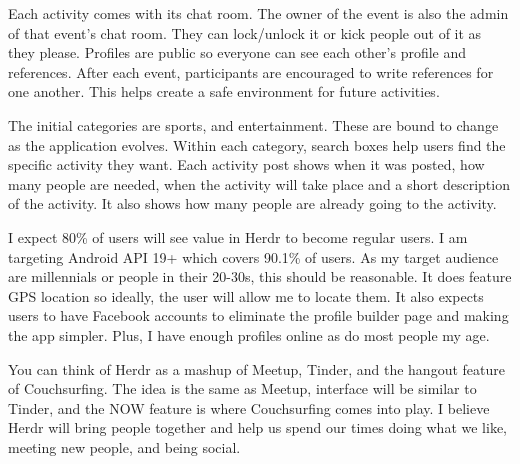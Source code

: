 \documentclass{article}
\begin{document}
Each activity comes with its chat room. The owner of the event is also the admin of that event's chat room. They can lock/unlock it or kick people out of it as they please. Profiles are public so everyone can see each other's profile and references. After each event, participants are encouraged to write references for one another. This helps create a safe environment for future activities.
\hfill \linebreak

The initial categories are sports, and entertainment. These are bound to change as the application evolves. Within each category, search boxes help users find the specific activity they want. Each activity post shows when it was posted, how many people are needed, when the activity will take place and a short description of the activity. It also shows how many people are already going to the activity.
\hfill \linebreak

I expect 80\% of users will see value in Herdr to become regular users. I am targeting Android API 19+ which covers 90.1\% of users. As my target audience are millennials or people in their 20-30s, this should be reasonable. It does feature GPS location so ideally, the user will allow me to locate them. It also expects users to have Facebook accounts to eliminate the profile builder page and making the app simpler. Plus, I have enough profiles online as do most people my age. 
\hfill \linebreak

You can think of Herdr as a mashup of Meetup, Tinder, and the hangout feature of Couchsurfing. The idea is the same as Meetup, interface will be similar to Tinder, and the NOW feature is where Couchsurfing comes into play. I believe Herdr will bring people together and help us spend our times doing what we like, meeting new people, and being social.
\end{document}
